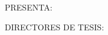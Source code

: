 \begin{titlepage}
\begin{minipage}{.7\textwidth}
{  		\makeatletter
      {\@grado\par}
      \makeatother

  		\large{\textsc{PRESENTA:}}\\[0.3cm]

      \makeatletter
      {\@alumno\par}
      \makeatother

  		\large{DIRECTORES DE TESIS:}\\[0.3cm]

      \makeatletter
		  {\@directores\par}
      \vfill
      {\@fecha}
      \makeatother

  	}
  \end{minipage}

  \thispagestyle{empty}
  \vspace*{\fill}

\end{titlepage}
\thispagestyle{empty}
\cleardoublepage
